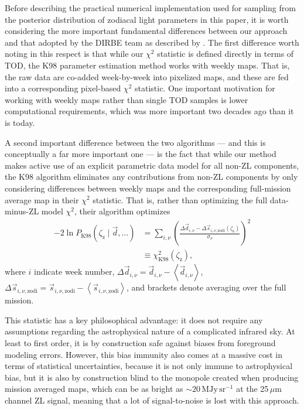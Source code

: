 \documentclass[twocolumn]{aa}
\newcommand{\dv}[0]{\vec{d}}
\newcommand{\s}[0]{\vec{s}}
\begin{document}
Before describing the practical numerical implementation used for
sampling from the posterior distribution of zodiacal light 
parameters in this paper, it is worth
considering the more important fundamental differences between
our approach and that adopted by the DIRBE team as described by
\citet{kelsall1998}. The first difference worth noting in this respect
is that while our $\chi^2$ statistic is defined directly in terms of
TOD, the K98 parameter estimation method works with weekly maps. That
is, the raw data are co-added week-by-week into pixelized maps, and
these are fed into a corresponding pixel-based $\chi^2$ statistic. One
important motivation for working with weekly maps rather than single
TOD samples is lower computational requirements, which was more
important two decades ago than it is today.

A second important difference between the two algorithms --- and this
is conceptually a far more important one --- is the fact that while our
method makes active use of an explicit parametric data model for all
non-ZL components, the K98 algorithm eliminates any contributions from
non-ZL components by only considering differences between weekly maps
and the corresponding full-mission average map in their $\chi^2$
statistic. That is, rather than optimizing the full data-minus-ZL model 
$\chi^2$, their algorithm optimizes
\begin{align}
  -2\ln P_{\mathrm{K98}}(\zeta_{\mathrm{z}} \mid\dv, \ldots) &= \sum_{i,\nu}
  \left(\frac{\Delta\dv_{i,\nu} -
    \Delta\s_{i,\nu,\mathrm{zodi}}(\zeta_\mathrm{s})}{\sigma_{\nu}}\right)^2 \nonumber\\
    &\equiv \chi^2_{\mathrm{K98}} (\zeta_{\mathrm{z}}),
  \label{eq:k98_chisq}
\end{align}
where $i$ indicate week number, $\Delta \dv_{i,\nu} = \dv_{i,\nu} -
\left<\dv_{i,\nu}\right>$, $\Delta \s_{i,\nu,\mathrm{zodi}} =
\s_{i,\nu,\mathrm{zodi}} - \left<\s_{i,\nu,\mathrm{zodi}}\right>$, and brackets
denote averaging over the full mission.

This statistic has a key philosophical advantage: it does
not require any assumptions regarding the astrophysical nature of a 
complicated infrared sky. At least to first order, it is by
construction safe against biases from foreground modeling
errors. However, this bias immunity also comes at a massive cost in
terms of statistical uncertainties, because it is not only immune to
astrophysical bias, but it is also by construction blind to the monopole 
created when producing mission averaged maps, which can be as bright as 
$\sim\mathrm{20\,MJy\,sr^{-1}}$ at the 25$\,\mu$m channel ZL signal, meaning that a lot of 
signal-to-noise is lost with this approach.
\end{document}
